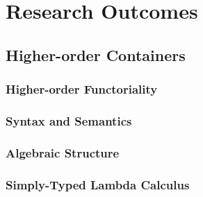 \chapter{Research Outcomes}

\section{Higher-order Containers}

\subsection{Higher-order Functoriality}

\subsection{Syntax and Semantics}

\subsection{Algebraic Structure}

\subsection{Simply-Typed Lambda Calculus}